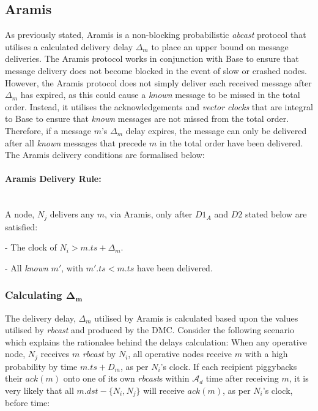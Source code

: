     \subsection{Aramis}\label{ssec:aramis}
    As previously stated,  \textsf{Aramis} is a non-blocking probabilistic \emph{abcast} protocol that utilises a calculated delivery delay $\Delta_m$ to place an upper bound on message deliveries.  The \textsf{Aramis} protocol works in conjunction with \textsf{Base} to ensure that message delivery does not become blocked in the event of slow or crashed nodes.  However, the \textsf{Aramis} protocol does not simply deliver each received message after $\Delta_m$ has expired, as this could cause a \emph{known} message to be missed in the total order.  Instead, it utilises the acknowledgements and \emph{vector clocks} that are integral to \textsf{Base} to ensure that \emph{known} messages are not missed from the total order.  Therefore, if a message $m$'s $\Delta_m$ delay expires, the message can only be delivered after all \emph{known} messages that precede $m$ in the total order have been delivered.  The \textsf{Aramis} delivery conditions are formalised below:
    
    \paragraph{\textsf{Aramis} Delivery Rule:}\hspace{0pt} \\
        A node, $N_j$ delivers any $m$, via \textsf{Aramis}, only after $D1_A$ and $D2$ stated below are satisfied:
        \begin{description}[labelindent=1cm]
            \item[$\boldsymbol{D1_A}$] - The clock of $N_i > m.ts + \Delta_{m}$. 
            \item[$\boldsymbol{D2}$] - All \emph{known} $m'$, with $m'.ts < m.ts$ have been delivered.
        \end{description}
    
    
        \subsubsection*{Calculating $\boldsymbol{\Delta_m}$    }
        The delivery delay, $\Delta_m$ utilised by \textsf{Aramis} is calculated based upon the values utilised by \emph{rbcast} and produced by the DMC.  Consider the following scenario which explains the rationalee behind the delays calculation: When any operative node, $N_j$ receives $m$ \emph{rbcast} by $N_i$, all operative nodes receive $m$ with a high probability by time $m.ts + D_m$, as per $N_i$'s clock.  If each recipient piggybacks their $ack(m)$ onto one of its own \emph{rbcast}s within $\mathcal{A}_d$ time after receiving $m$, it is very likely that all $m.dst - \{N_i, N_j\}$ will receive $ack(m)$, as per $N_i$'s clock, before time:
        
